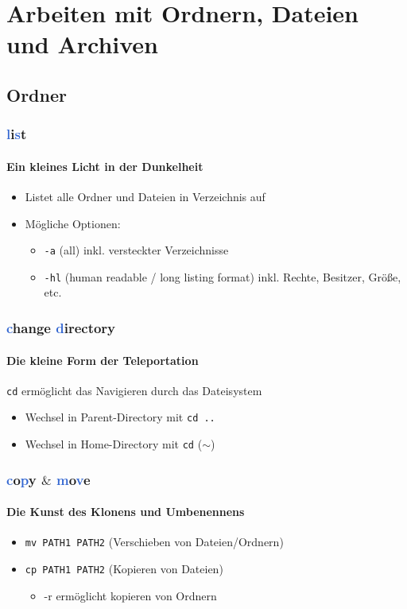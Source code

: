 \documentclass[12pt,utf8]{beamer}
\begin{document}
\section{Arbeiten mit Ordnern, Dateien und Archiven}
\subsection{Ordner}
\begin{frame}
	\frametitle{\textcolor{highlight}{l}i\textcolor{highlight}{s}t}
	\framesubtitle{Ein kleines Licht in der Dunkelheit}
	\begin{itemize}
		\item Listet alle Ordner und Dateien in Verzeichnis auf
		\item Mögliche Optionen:
		\begin{itemize}[<+->]
			\item \texttt{-a}  (all) inkl. versteckter Verzeichnisse
			\item \texttt{-hl}  (human readable / long listing format) inkl. Rechte, Besitzer, Größe, etc.
		\end{itemize}
	\end{itemize}
\end{frame}

\begin{frame}
	\frametitle{\textcolor{highlight}{c}hange \textcolor{highlight}{d}irectory}
	\framesubtitle{Die kleine Form der Teleportation}
	\texttt{cd} ermöglicht das Navigieren durch das Dateisystem
	\begin{itemize}
		\item Wechsel in Parent-Directory mit \texttt{cd ..}
		\item Wechsel in Home-Directory mit \texttt{cd} ($\sim$)
	\end{itemize}
\end{frame}

\begin{frame}
\frametitle{\textcolor{highlight}{c}o\textcolor{highlight}{p}y $\&$ \textcolor{highlight}{m}o\textcolor{highlight}{v}e}
\framesubtitle{Die Kunst des Klonens und Umbenennens}
\begin{itemize}
	\item \texttt{mv PATH1 PATH2} (Verschieben von Dateien/Ordnern)
	\item \texttt{cp PATH1 PATH2} (Kopieren von Dateien)
	\begin{itemize}
		\item -r ermöglicht kopieren von Ordnern
	\end{itemize}
\end{itemize}
\end{frame}
\end{document}
